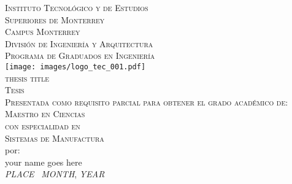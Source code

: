 
\thispagestyle{empty}
  \begin{center}
     {\LARGE \textsc{Instituto Tecnol\'{o}gico y de Estudios \\
                    Superiores de Monterrey}} \\[2mm]
                    {\large  \textsc{Campus Monterrey\\%
                        Divisi\'{o}n de Ingenier\'{i}a y Arquitectura\\
                        Programa de Graduados en Ingenier\'{i}a}}\\
   \vspace*{2em}
   \texttt{[image: images/logo\_tec\_001.pdf]}\\
   {\large \textsc{ thesis title}}\\[7mm]
   {\Large \textsc{Tesis}}\\[5mm]
   \textsc{Presentada como requisito parcial para obtener el grado acad\'emico de:} \\[4 mm]
   {\large \textsc{Maestro en Ciencias}}\\
   \textsc{con especialidad en} \\
   {\large \textsc{Sistemas de Manufactura}}\\[6mm]
   por: \\ [2mm]
   {\large your name goes here }\\[3mm]     
   \emph{PLACE} ~\emph{MONTH}, \emph{YEAR} 
  \end{center}
